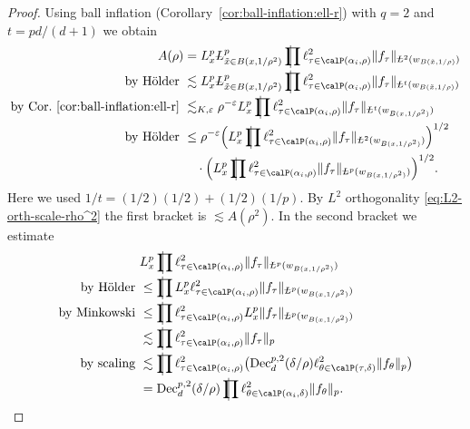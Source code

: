 \begin{proof}
Using ball inflation (Corollary~\ref{cor:ball-inflation:ell-r}) with $q=2$ and $t=p d/(d+1)$ we obtain
\begin{align*}
A(\rho)
&=
L^{p}_{x} \avL^{p}_{\tilde{x} \in B(x,1/\rho^{2})} \avprod \ell^{2}_{\tau\in \Part[\alpha_i]{\rho}} \norm{f_{\tau}}_{\avL^{2}(w_{B(\tilde{x},1/\rho)})}\\
\text{by H\"older } &\lesssim
L^{p}_{x} \avL^{p}_{\tilde{x} \in B(x,1/\rho^{2})} \avprod \ell^{2}_{\tau\in \Part[\alpha_i]{\rho}} \norm{f_{\tau}}_{\avL^{t}(w_{B(\tilde{x},1/\rho)})}\\
\text{by Cor.~\ref{cor:ball-inflation:ell-r} } &\lesssim_{K,\epsilon} \rho^{-\epsilon}
L^{p}_{x} \avprod \ell^{2}_{\tau\in \Part[\alpha_i]{\rho}} \norm{f_{\tau}}_{\avL^{t}(w_{B(x,1/\rho^{2})})}\\
\text{by H\"older } &\leq \rho^{-\epsilon}
\Big( L^{p}_{x} \avprod \ell^{2}_{\tau\in \Part[\alpha_i]{\rho}} \norm{f_{\tau}}_{\avL^{2}(w_{B(x,1/\rho^{2})})} \Big)^{1/2}\\
&\quad\cdot
\Big( L^{p}_{x} \avprod \ell^{2}_{\tau\in \Part[\alpha_i]{\rho}} \norm{f_{\tau}}_{\avL^{p}(w_{B(x,1/\rho^{2})})} \Big)^{1/2}.
\end{align*}
Here we used $1/t = (1/2)(1/2) + (1/2)(1/p)$.
By $L^{2}$ orthogonality \eqref{eq:L2-orth-scale-rho^2} the first bracket is $\lesssim A(\rho^{2})$.
In the second bracket we estimate
\begin{equation}
\label{eq:37}
\begin{split}
&
L^{p}_{x} \avprod \ell^{2}_{\tau\in \Part[\alpha_i]{\rho}} \norm{f_{\tau}}_{\avL^{p}(w_{B(x,1/\rho^2)})}\\
\text{by H\"older }&\leq
\avprod L^{p}_{x} \ell^{2}_{\tau\in \Part[\alpha_i]{\rho}} \norm{f_{\tau}}_{\avL^{p}(w_{B(x,1/\rho^2)})}\\
\text{by Minkowski }&\leq
\avprod \ell^{2}_{\tau\in \Part[\alpha_i]{\rho}} L^{p}_{x} \norm{f_{\tau}}_{\avL^{p}(w_{B(x,1/\rho^2)})}\\
&\lesssim
\avprod \ell^{2}_{\tau\in \Part[\alpha_i]{\rho}} \norm{f_{\tau}}_{p}\\
\text{by scaling }&\lesssim
\avprod \ell^{2}_{\tau\in \Part[\alpha_i]{\rho}} \bigl( \Dec_{d}^{p,2}(\delta/\rho) \ell^{2}_{\theta\in \Part[\tau]{\delta}} \norm{f_{\theta}}_{p} \bigr)\\
&=
\Dec_{d}^{p,2}(\delta/\rho) \avprod \ell^{2}_{\theta\in \Part[\alpha_i]{\delta}} \norm{f_{\theta}}_{p}.
\qedhere
\end{split}
\end{equation}
\end{proof}

